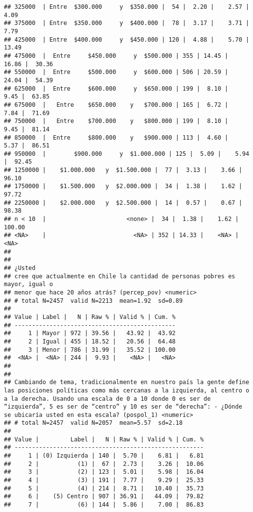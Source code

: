 \documentclass[
  10,
  landscape,
  legalpaper]{article}
\begin{document}
\begin{verbatim}
## 325000  | Entre  $300.000     y  $350.000 |  54 |  2.20 |    2.57 |   4.09
## 375000  | Entre  $350.000     y  $400.000 |  78 |  3.17 |    3.71 |   7.79
## 425000  | Entre  $400.000     y  $450.000 | 120 |  4.88 |    5.70 |  13.49
## 475000  |  Entre     $450.000     y  $500.000 | 355 | 14.45 |   16.86 |  30.36
## 550000  |  Entre     $500.000     y  $600.000 | 506 | 20.59 |   24.04 |  54.39
## 625000  |  Entre     $600.000     y  $650.000 | 199 |  8.10 |    9.45 |  63.85
## 675000  |   Entre    $650.000    y   $700.000 | 165 |  6.72 |    7.84 |  71.69
## 750000  |   Entre    $700.000    y   $800.000 | 199 |  8.10 |    9.45 |  81.14
## 850000  |  Entre     $800.000    y   $900.000 | 113 |  4.60 |    5.37 |  86.51
## 950000  |        $900.000     y  $1.000.000 | 125 |  5.09 |    5.94 |  92.45
## 1250000 |    $1.000.000   y  $1.500.000 |  77 |  3.13 |    3.66 |  96.10
## 1750000 |    $1.500.000   y  $2.000.000 |  34 |  1.38 |    1.62 |  97.72
## 2250000 |    $2.000.000   y  $2.500.000 |  14 |  0.57 |    0.67 |  98.38
## n < 10  |                       <none> |  34 |  1.38 |    1.62 | 100.00
## <NA>    |                         <NA> | 352 | 14.33 |    <NA> |   <NA>
## 
## 
## ¿Usted
## cree que actualmente en Chile la cantidad de personas pobres es mayor, igual o
## menor que hace 20 años atrás? (percep_pov) <numeric>
## # total N=2457  valid N=2213  mean=1.92  sd=0.89
## 
## Value | Label |   N | Raw % | Valid % | Cum. %
## ----------------------------------------------
##     1 | Mayor | 972 | 39.56 |   43.92 |  43.92
##     2 | Igual | 455 | 18.52 |   20.56 |  64.48
##     3 | Menor | 786 | 31.99 |   35.52 | 100.00
##  <NA> |  <NA> | 244 |  9.93 |    <NA> |   <NA>
## 
## 
## Cambiando de tema, tradicionalmente en nuestro país la gente define las posiciones políticas como más cercanas a la izquierda, al centro o a la derecha. Usando una escala de 0 a 10 donde 0 es ser de “izquierda”, 5 es ser de “centro” y 10 es ser de “derecha”: - ¿Dónde se ubicaría usted en esta escala? (pospol_1) <numeric>
## # total N=2457  valid N=2057  mean=5.57  sd=2.18
## 
## Value |         Label |   N | Raw % | Valid % | Cum. %
## ------------------------------------------------------
##     1 | (0) Izquierda | 140 |  5.70 |    6.81 |   6.81
##     2 |           (1) |  67 |  2.73 |    3.26 |  10.06
##     3 |           (2) | 123 |  5.01 |    5.98 |  16.04
##     4 |           (3) | 191 |  7.77 |    9.29 |  25.33
##     5 |           (4) | 214 |  8.71 |   10.40 |  35.73
##     6 |    (5) Centro | 907 | 36.91 |   44.09 |  79.82
##     7 |           (6) | 144 |  5.86 |    7.00 |  86.83

\end{verbatim}
\end{document}
